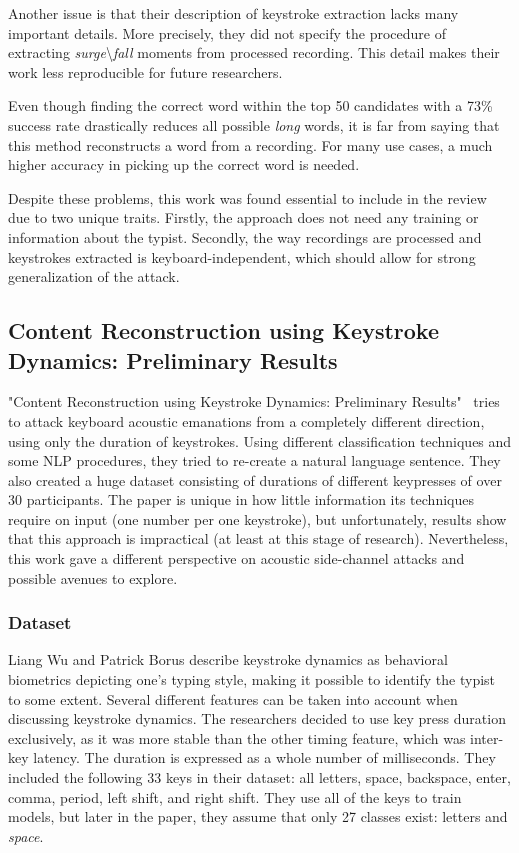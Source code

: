 \documentclass[../main.tex]{subfiles}
\begin{document}
Another issue is that their description of keystroke extraction lacks many important details. More precisely, they did not specify the procedure of extracting \textit{surge}{\textbackslash}\textit{fall} moments from processed recording. This detail makes their work less reproducible for future researchers.

Even though finding the correct word within the top 50 candidates with a 73\% success rate drastically reduces all possible \textit{long} words, it is far from saying that this method reconstructs a word from a recording. For many use cases, a much higher accuracy in picking up the correct word is needed.

Despite these problems, this work was found essential to include in the review due to two unique traits. Firstly, the approach does not need any training or information about the typist. Secondly, the way recordings are processed and keystrokes extracted is keyboard-independent, which should allow for strong generalization of the attack.


\subsection{Content Reconstruction using Keystroke Dynamics: Preliminary Results}
\label{sec:content_reconstruction_using_keystroke_dynamics_preliminary_results}
"Content Reconstruction using Keystroke Dynamics: Preliminary Results"~\cite{content_reconstruction_2014} tries to attack keyboard acoustic emanations from a completely different direction, using only the duration of keystrokes. Using different classification techniques and some NLP procedures, they tried to re-create a natural language sentence. They also created a huge dataset consisting of durations of different keypresses of over 30 participants. The paper is unique in how little information its techniques require on input (one number per one keystroke), but unfortunately, results show that this approach is impractical (at least at this stage of research). Nevertheless, this work gave a different perspective on acoustic side-channel attacks and possible avenues to explore.

\subsubsection{Dataset}
Liang Wu and Patrick Borus describe keystroke dynamics as behavioral biometrics depicting one's typing style, making it possible to identify the typist to some extent. Several different features can be taken into account when discussing keystroke dynamics. The researchers decided to use key press duration exclusively, as it was more stable than the other timing feature, which was inter-key latency. The duration is expressed as a whole number of milliseconds. They included the following 33 keys in their dataset: all letters, space, backspace, enter, comma, period, left shift, and right shift. They use all of the keys to train models, but later in the paper, they assume that only 27 classes exist: letters and  \textit{space}.
\end{document}
